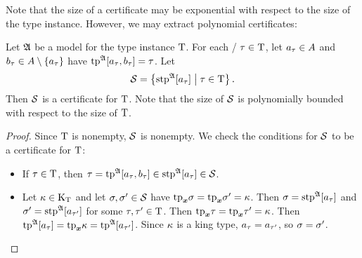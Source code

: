 Note that the size of a certificate may be exponential with respect to the size
of the type instance.
However, we may extract polynomial certificates:
\begin{lemma}\label{lem:cert-extract}
Let $\mathfrak{A}$ be a model for the type instance $\mathrm{T}$.
For each \twotype/ $\tau\in\mathrm{T}$,
let $a_{\tau}\in A$ and $b_{\tau}\in A\setminus\left\{a_{\tau}\right\}$
have $\operatorname{tp}^{\mathfrak{A}}[a_{\tau},b_{\tau}] = \tau$.
Let 
\[
  \mathcal{S} = \left\{\operatorname{stp}^{\mathfrak{A}}[a_{\tau}]\mathrel{}\middle|\mathrel{}\tau \in \mathrm{T}\right\}.
\]
Then $\mathcal{S}$ is a certificate for $\mathrm{T}$.
Note that the size of $\mathcal{S}$ is polynomially bounded with respect to the
size of $\mathrm{T}$.
\end{lemma}
\begin{proof}
Since $\mathrm{T}$ is nonempty, $\mathcal{S}$ is nonempty.
We check the conditions for $\mathcal{S}$ to be a certificate for $\mathrm{T}$:
\begin{itemize}
  \item[\refcondcertT]
  If $\tau\in\mathrm{T}$,
  then $\tau=\operatorname{tp}^{\mathfrak{A}}[a_{\tau},b_{\tau}] \in \operatorname{stp}^{\mathfrak{A}}[a_{\tau}] \in
  \mathcal{S}$.
  \item[\refcondcertk]
  Let $\kappa\in{\mathrm{K}}_{\mathrm{T}}$ and let $\sigma,{\sigma'} \in \mathcal{S}$ have
  $\mathrm{tp}_{\bm{x}}\sigma = \mathrm{tp}_{\bm{x}}{\sigma'} = \kappa$.
  Then $\sigma = \operatorname{stp}^{\mathfrak{A}}[a_{\tau}]$ and ${\sigma'} = \operatorname{stp}^{\mathfrak{A}}[a_{{\tau'}}]$ for
  some $\tau,{\tau'}\in\mathrm{T}$.
  Then $\mathrm{tp}_{\bm{x}}\tau = \mathrm{tp}_{\bm{x}}{\tau'} = \kappa$.
  Then $\operatorname{tp}^{\mathfrak{A}}[a_{\tau}] = \mathrm{tp}_{\bm{x}}\kappa = \operatorname{tp}^{\mathfrak{A}}[a_{{\tau'}}]$.
  Since $\kappa$ is a king type, $a_{\tau} = a_{{\tau'}}$, so
  $\sigma = {\sigma'}$.
\end{itemize}
\end{proof}

